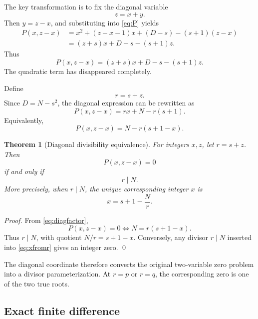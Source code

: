 \documentclass[11pt,a4paper]{article}
\newtheorem{theorem}{Theorem}[section]
\begin{document}
The key transformation is to fix the diagonal variable
\begin{equation}
z=x+y.
\end{equation}
Then \(y=z-x\), and substituting into \eqref{eq:P} yields
\begin{align}
P(x,z-x)
&=x^2+(z-x-1)x+(D-s)-(s+1)(z-x)\\
&=(z+s)x+D-s-(s+1)z.
\end{align}
Thus
\begin{equation}
\boxed{P(x,z-x)=(z+s)x+D-s-(s+1)z.}
\label{eq:diaglinear}
\end{equation}
The quadratic term has disappeared completely.

Define
\begin{equation}
r=s+z.
\end{equation}
Since \(D=N-s^2\), the diagonal expression can be rewritten as
\begin{equation}
\boxed{
P(x,z-x)=rx+N-r(s+1).
}
\label{eq:diagN}
\end{equation}
Equivalently,
\begin{equation}
\boxed{
P(x,z-x)=N-r(s+1-x).
}
\label{eq:diagfactor}
\end{equation}

\begin{theorem}[Diagonal divisibility equivalence]
For integers \(x,z\), let \(r=s+z\). Then
\begin{equation}
P(x,z-x)=0
\end{equation}
if and only if
\begin{equation}
r\mid N.
\end{equation}
More precisely, when \(r\mid N\), the unique corresponding integer \(x\) is
\begin{equation}
\boxed{x=s+1-\frac Nr.}
\label{eq:xfromr}
\end{equation}
\end{theorem}

\begin{proof}
From \eqref{eq:diagfactor},
\[
P(x,z-x)=0
\iff
N=r(s+1-x).
\]
Thus \(r\mid N\), with quotient \(N/r=s+1-x\). Conversely, any divisor \(r\mid N\) inserted into \eqref{eq:xfromr} gives an integer zero. \qed
\end{proof}

The diagonal coordinate therefore converts the original two-variable zero problem into a divisor parameterization. At \(r=p\) or \(r=q\), the corresponding zero is one of the two true roots.

\subsection{Exact finite difference}
\end{document}
